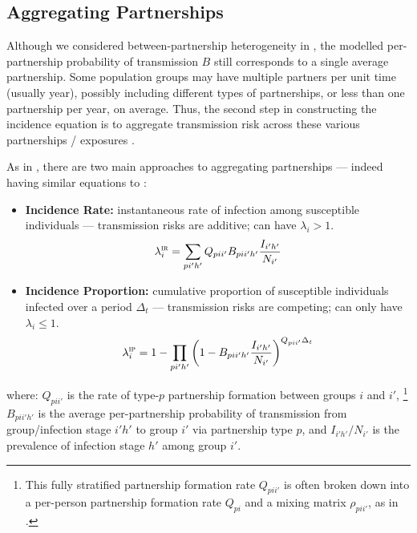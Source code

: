 \subsection{Aggregating Partnerships}\label{foi.prior.part}
Although we considered between-partnership heterogeneity in ,
the modelled per-partnership probability of transmission $B$
still corresponds to a single average partnership.
Some population groups may have multiple partners per unit time (usually year),
possibly including different types of partnerships,
or less than one partnership per year, on average.
Thus, the second step in constructing the incidence equation is to
aggregate transmission risk across these various partnerships / exposures \cite{Allard1990}.
\par
As in , there are two main approaches to aggregating partnerships
--- indeed having similar equations to :
\begin{itemize}
  \item \textbf{Incidence Rate:}
  instantaneous rate of infection among susceptible individuals
  --- transmission risks are additive; can have $\lambda_i > 1$.
  \begin{equation}\label{eq:foi.ir}
    \lambda_i^\textsc{ir} = \sum_{pi'h'} Q_{pii'} B_{pii'h'} \frac{{I}_{i'h'}}{N_{i'}}
  \end{equation}
  \item \textbf{Incidence Proportion:}
  cumulative proportion of susceptible individuals infected over a period $\Delta_t$
  --- transmission risks are competing; can only have $\lambda_i \le 1$.
  \begin{equation}\label{eq:foi.ip}
    \lambda_i^\textsc{ip} = 1 - \prod_{pi'h'} {\left(1 - B_{pii'h'} \frac{{I}_{i'h'}}{N_{i'}}\right)}^{Q_{pii'} \Delta_t}
  \end{equation}
\end{itemize} where:
$Q_{pii'}$ is the rate of type-$p$ partnership formation between groups $i$ and $i'$,%
\footnote{This fully stratified partnership formation rate $Q_{pii'}$ is often broken down into
a per-person partnership formation rate $Q_{pi}$ and a mixing matrix $\rho_{pii'}$,
as in .}
$B_{pii'h'}$ is the average per-partnership probability of transmission
from group/infection stage $i'h'$ to group $i'$ via partnership type $p$,
and $I_{i'h'}/N_{i'}$ is the prevalence of infection stage $h'$ among group $i'$.
